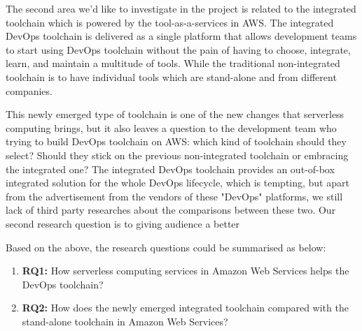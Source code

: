 \par
The second area we'd like to investigate in the project is related to the integrated toolchain which is powered by the tool-as-a-services in AWS.
The integrated DevOps toolchain is delivered as a single platform that allows development teams to start using DevOps toolchain without the pain of having to choose, integrate, learn, and maintain a multitude of tools. While the traditional non-integrated toolchain is to have individual tools which are stand-alone and from different companies.
\par
This newly emerged type of toolchain is one of the new changes that serverless computing brings, but it also leaves a question to the development team who trying to build DevOps toolchain on AWS: which kind of toolchain should they select? Should they stick on the previous non-integrated toolchain or embracing the integrated one? The integrated DevOps toolchain provides an out-of-box integrated solution for the whole DevOps lifecycle, which is tempting, but apart from the advertisement from the vendors of these "DevOps" platforms, we still lack of third party researches about the comparisons between these two. Our second research question is to giving audience a better 
\par
Based on the above, the research questions could be summarised as below:
\begin{enumerate}
    \item \textbf{RQ1:} How serverless computing services in Amazon Web Services helps the DevOps toolchain?
    \item \textbf{RQ2:} How does the newly emerged integrated toolchain compared with the stand-alone toolchain in Amazon Web Services?
\end{enumerate}
